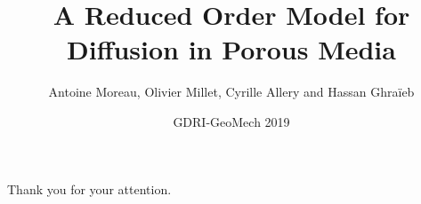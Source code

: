 \documentclass[handout]%
{beamer}
\title{A Reduced Order Model for Diffusion in Porous Media}
\author{Antoine Moreau, Olivier Millet, Cyrille Allery and Hassan Ghra\"ieb}
\institute{LaSIE, Universit\'e de La Rochelle}
\date{GDRI-GeoMech 2019}
\begin{document}

\maketitle


%


%


%


%






\begin{frame}%
\begin{center}
Thank you for your attention.
\end{center}
\end{frame}

%
%
\end{document}
